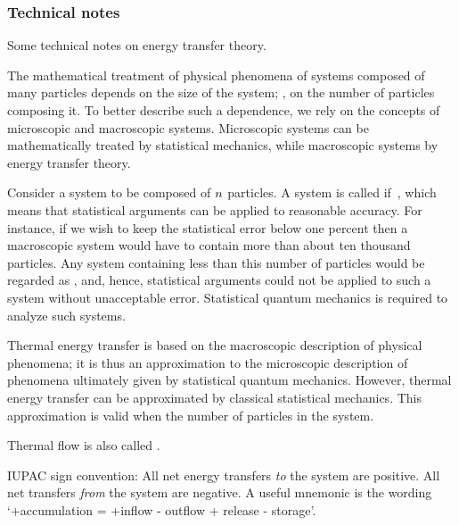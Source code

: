 \subsubsection{Technical notes}
Some technical notes on energy transfer theory.

\begin{technote}
The mathematical treatment of physical phenomena of systems composed of many particles depends on the size of the system; \ie, on the number of particles composing it. To better describe such a dependence, we rely on the concepts of microscopic and macroscopic systems. Microscopic systems can be mathematically treated by statistical mechanics, while macroscopic systems by energy transfer theory.

Consider a system to be composed of $n$ particles. A system is called  if
\beq
{} \,,
\eeq
which means that statistical arguments can be applied to reasonable accuracy. For instance, if we wish to keep the statistical error below one percent then a macroscopic system would have to contain more than about ten thousand particles. Any system containing less than this number of particles would be regarded as , and, hence, statistical arguments could not be applied to such a system without unacceptable error. Statistical quantum mechanics is required to analyze such systems.

Thermal energy transfer is based on the macroscopic description of physical phenomena; it is thus an approximation to the microscopic description of phenomena ultimately given by statistical quantum mechanics. However, thermal energy transfer can be approximated by classical statistical mechanics. This approximation is valid when the number of particles in the system.
\end{technote}

\begin{technote}
Thermal flow is also called .
\end{technote}

\begin{technote}
IUPAC sign convention: All net energy transfers \emph{to} the system are positive. All net transfers \emph{from} the system are negative. A useful mnemonic is the wording `+accumulation = +inflow - outflow + release - storage'.
\end{technote}

